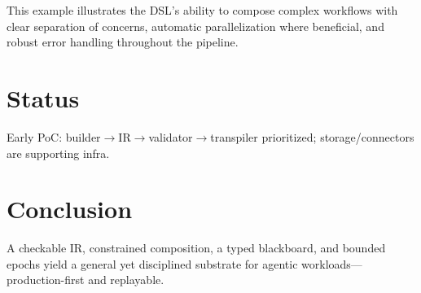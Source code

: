 \documentclass[11pt,a4paper]{article}
\begin{document}
This example illustrates the DSL's ability to compose complex workflows with clear separation of concerns, automatic parallelization where beneficial, and robust error handling throughout the pipeline.
\section{Status}
Early PoC: builder$\rightarrow$IR$\rightarrow$validator$\rightarrow$transpiler prioritized; storage/connectors are supporting infra.
\section{Conclusion}
A checkable IR, constrained composition, a typed blackboard, and bounded epochs yield a general yet disciplined substrate for agentic workloads—production-first and replayable.
\end{document}
